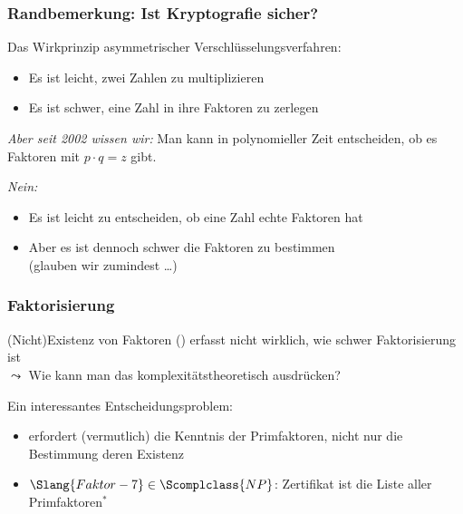 \documentclass[aspectratio=1610,onlymath]{beamer}
\begin{document}
\begin{frame}\frametitle{Randbemerkung: Ist Kryptografie sicher?}

Das Wirkprinzip asymmetrischer Verschlüsselungsverfahren:
\begin{itemize}
\item Es ist \alert{leicht}, zwei Zahlen zu multiplizieren
\item Es ist \alert{schwer}, eine Zahl in ihre Faktoren zu zerlegen
\end{itemize}\medskip
\emph{Aber seit 2002 wissen wir:} Man kann in polynomieller Zeit entscheiden, ob es
Faktoren mit $p\cdot q=z$ gibt.\bigskip

\pause\bigskip

\emph{Nein:}
\begin{itemize}
\item Es ist \alert{leicht} zu entscheiden, ob eine Zahl echte Faktoren hat
\item Aber es ist dennoch \alert{schwer} die Faktoren zu bestimmen\\
(glauben wir zumindest \ldots)
\end{itemize}

\end{frame}

\begin{frame}\frametitle{Faktorisierung}

(Nicht)Existenz von Faktoren () erfasst nicht wirklich,
wie schwer Faktorisierung ist\\
$\leadsto$ Wie kann man das komplexitätstheoretisch ausdrücken?
\medskip\pause

\pause

Ein interessantes Entscheidungsproblem:
\begin{itemize}
\item {} erfordert (vermutlich) die Kenntnis der Primfaktoren, nicht nur
die Bestimmung deren Existenz\pause
\item $\Slang{Faktor-7}\in\Scomplclass{NP}$\pause: Zertifikat ist die Liste aller Primfaktoren${}^*$
\end{itemize}


\end{frame}
\end{document}
